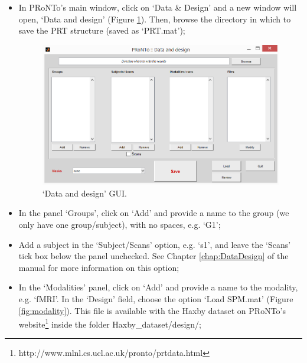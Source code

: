 \begin{itemize}
	
	\item In PRoNTo's main window, click on `Data \& Design' and a new window will open, `Data and design' (Figure \ref{fig:dataDesign}). Then, browse the directory in which to save the PRT structure (saved as `PRT.mat');
	
\begin{figure}[!h]
	\centering
			\includegraphics[scale=0.7]{images/Tutorial/classification/dataDesign.png}
	\caption{`Data and design' GUI.}
	\label{fig:dataDesign}
\end{figure}
	
	\item In the panel `Groups', click on `Add' and provide a name to the group (we only have one group/subject), with no spaces, e.g. `G1';
	
	\item Add a subject in the `Subject/Scans' option, e.g. `s1', and leave the `Scans' tick box below the panel unchecked. See Chapter \ref{chap:DataDesign} of the manual for more information on this option;
	
	\item In the `Modalities' panel, click on `Add' and provide a name to the modality, e.g. `fMRI'. In the `Design' field, choose the option `Load SPM.mat' (Figure \ref{fig:modality}). This file is available with the Haxby dataset on PRoNTo's website\footnote{http://www.mlnl.cs.ucl.ac.uk/pronto/prtdata.html} inside the folder Haxby\_dataset/design/;
	

\end{itemize}
